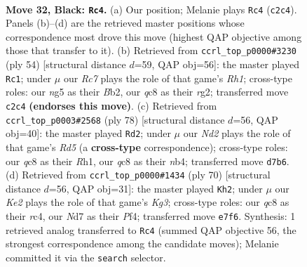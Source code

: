 \documentclass[11pt]{article}
\begin{document}
\clearpage

\begin{figure}[p]\centering
\begin{subfigure}{0.46\textwidth}\centering
\resizebox{\linewidth}{!}{%
\newchessgame
\chessboard[
  setfen={2Q5/2pnkp1p/8/3p2N1/5P2/8/2r3P1/R4RK1 b - - 0 32},
  showmover=false,
  pgfstyle=straightmove, color=movearrow, markmove={c2-c4}
]}
\caption{}
\end{subfigure}\hfill
\begin{subfigure}{0.46\textwidth}\centering
\resizebox{\linewidth}{!}{%
\newchessgame
\chessboard[
  setfen={2k5/2r2p1p/p1nRp3/8/P7/8/PB2KPrP/7R w - - 4 28},
  showmover=false,
  pgfstyle=straightmove, color=movearrow, markmove={h1-c1}
]}
\caption{}
\end{subfigure}
\\[4pt]
\begin{subfigure}{0.46\textwidth}\centering
\resizebox{\linewidth}{!}{%
\newchessgame
\chessboard[
  setfen={4rk2/p4p2/8/3R4/1n2N3/5P1r/PP3K1p/7R w - - 2 40},
  showmover=false,
  pgfstyle=straightmove, color=movearrow, markmove={d5-d2}
]}
\caption{}
\end{subfigure}\hfill
\begin{subfigure}{0.46\textwidth}\centering
\resizebox{\linewidth}{!}{%
\newchessgame
\chessboard[
  setfen={2r4k/3R2pp/8/p7/2r2P2/2P3KP/P1R5/8 w - - 5 36},
  showmover=false,
  pgfstyle=straightmove, color=movearrow, markmove={g3-h2}
]}
\caption{}
\end{subfigure}
\caption{\textbf{Move 32, Black: \texttt{Rc4}.} (a) Our position; Melanie plays \texttt{Rc4} (\texttt{c2c4}). Panels (b)--(d) are the retrieved master positions whose correspondence most drove this move (highest QAP objective among those that transfer to it). (b) Retrieved from \texttt{ccrl\_top\_p0000\#3230} (ply 54) [structural distance $d$=59, QAP obj=56]: the master played \texttt{Rc1}; under $\mu$ our \emph{Rc7} plays the role of that game's \emph{Rh1}; cross-type roles: our \emph{n}g5 as their \emph{B}b2, our \emph{q}c8 as their \emph{r}g2; transferred move \texttt{c2c4} \textbf{(endorses this move)}. (c) Retrieved from \texttt{ccrl\_top\_p0003\#2568} (ply 78) [structural distance $d$=56, QAP obj=40]: the master played \texttt{Rd2}; under $\mu$ our \emph{Nd2} plays the role of that game's \emph{Rd5} (a \textbf{cross-type} correspondence); cross-type roles: our \emph{q}c8 as their \emph{R}h1, our \emph{q}c8 as their \emph{n}b4; transferred move \texttt{d7b6}. (d) Retrieved from \texttt{ccrl\_top\_p0000\#1434} (ply 70) [structural distance $d$=56, QAP obj=31]: the master played \texttt{Kh2}; under $\mu$ our \emph{Ke2} plays the role of that game's \emph{Kg3}; cross-type roles: our \emph{q}c8 as their \emph{r}c4, our \emph{N}d7 as their \emph{P}f4; transferred move \texttt{e7f6}. Synthesis: 1 retrieved analog transferred to \texttt{Rc4} (summed QAP objective 56, the strongest correspondence among the candidate moves); Melanie committed it via the \texttt{search} selector.}
\label{fig:thought-m63}
\end{figure}
\end{document}
